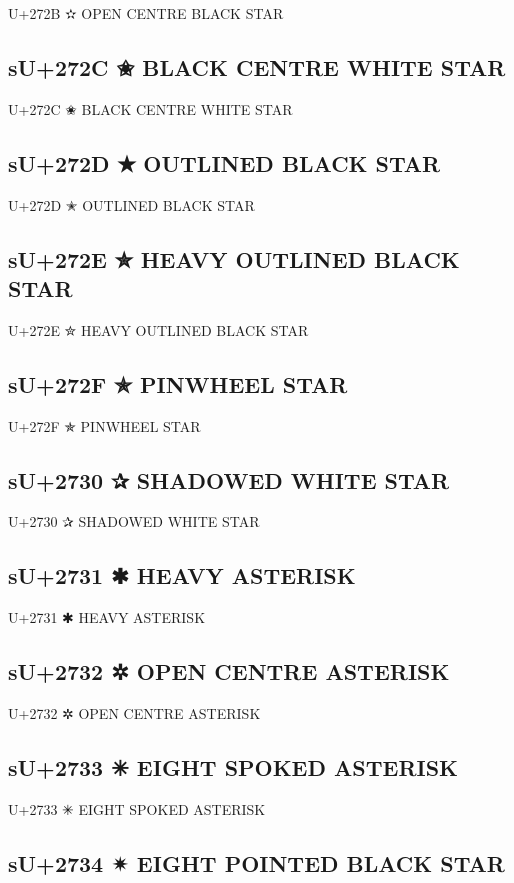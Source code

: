 U+272B ✫ OPEN CENTRE BLACK STAR

\subsection{sU+272C ✬ BLACK CENTRE WHITE STAR}

U+272C ✬ BLACK CENTRE WHITE STAR

\subsection{sU+272D ✭ OUTLINED BLACK STAR}

U+272D ✭ OUTLINED BLACK STAR

\subsection{sU+272E ✮ HEAVY OUTLINED BLACK STAR}

U+272E ✮ HEAVY OUTLINED BLACK STAR

\subsection{sU+272F ✯ PINWHEEL STAR}

U+272F ✯ PINWHEEL STAR

\subsection{sU+2730 ✰ SHADOWED WHITE STAR}

U+2730 ✰ SHADOWED WHITE STAR

\subsection{sU+2731 ✱ HEAVY ASTERISK}

U+2731 ✱ HEAVY ASTERISK

\subsection{sU+2732 ✲ OPEN CENTRE ASTERISK}

U+2732 ✲ OPEN CENTRE ASTERISK

\subsection{sU+2733 ✳ EIGHT SPOKED ASTERISK}

U+2733 ✳ EIGHT SPOKED ASTERISK

\subsection{sU+2734 ✴ EIGHT POINTED BLACK STAR}

